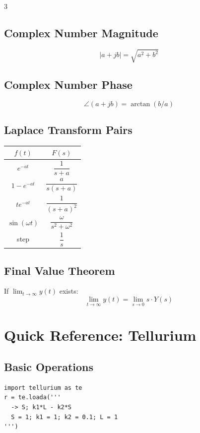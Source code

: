 \documentclass[10pt,landscape,letter]{article}
\begin{document}
\begin{multicols}{3}
\subsection{Complex Number Magnitude}
\begin{equation*}
|a + jb| = \sqrt{a^2 + b^2}
\end{equation*}

\subsection{Complex Number Phase}
\begin{equation*}
\angle(a + jb) = \arctan(b/a)
\end{equation*}

\subsection{Laplace Transform Pairs}
\begin{center}
\begin{tabular}{cc}
\toprule
$f(t)$ & $F(s)$ \\
\midrule
$e^{-at}$ & $\dfrac{1}{s+a}$ \\[8pt]
$1 - e^{-at}$ & $\dfrac{a}{s(s+a)}$ \\[8pt]
$te^{-at}$ & $\dfrac{1}{(s+a)^2}$ \\[8pt]
$\sin(\omega t)$ & $\dfrac{\omega}{s^2+\omega^2}$ \\[8pt]
step & $\dfrac{1}{s}$ \\
\bottomrule
\end{tabular}
\end{center}

\subsection{Final Value Theorem}
If $\lim_{t\to\infty} y(t)$ exists:
\begin{equation*}
\lim_{t\to\infty} y(t) = \lim_{s\to 0} s \cdot Y(s)
\end{equation*}

\section{Quick Reference: Tellurium}

\subsection{Basic Operations}
\begin{Verbatim}[fontsize=\scriptsize]
import tellurium as te
r = te.loada('''
  -> S; k1*L - k2*S
  S = 1; k1 = 1; k2 = 0.1; L = 1
''')


\end{Verbatim}
\end{multicols}
\end{document}
